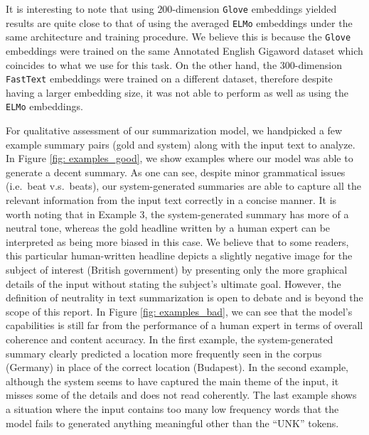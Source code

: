 It is interesting to note that using $200$-dimension \texttt{Glove} embeddings yielded results are quite close to that of using the averaged \texttt{ELMo} embeddings under the same architecture and training procedure. We believe this is because the \texttt{Glove} embeddings were trained on the same Annotated English Gigaword dataset which coincides to what we use for this task. On the other hand, the $300$-dimension \texttt{FastText} embeddings were trained on a different dataset, therefore despite having a larger embedding size, it was not able to perform as well as using the \texttt{ELMo} embeddings.

For qualitative assessment of our summarization model, we handpicked a few example summary pairs (gold and system) along with the input text to analyze. In Figure \ref{fig: examples_good}, we show examples where our model was able to generate a decent summary. As one can see, despite minor grammatical issues (i.e.\ beat v.s.\ beats), our system-generated summaries are able to capture all the relevant information from the input text correctly in a concise manner. It is worth noting that in Example 3, the system-generated summary has more of a neutral tone, whereas the gold headline written by a human expert can be interpreted as being more biased in this case. We believe that to some readers, this particular human-written headline depicts a slightly negative image for the subject of interest (British government) by presenting only the more graphical details of the input without stating the subject's ultimate goal. However, the definition of neutrality in text summarization is open to debate and is beyond the scope of this report. In Figure \ref{fig: examples_bad}, we can see that the model's capabilities is still far from the performance of a human expert in terms of overall coherence and content accuracy. In the first example, the system-generated summary clearly predicted a location more frequently seen in the corpus (Germany) in place of the correct location (Budapest). In the second example, although the system seems to have captured the main theme of the input, it misses some of the details and does not read coherently. The last example shows a situation where the input contains too many low frequency words that the model fails to generated anything meaningful other than the ``UNK'' tokens. 


